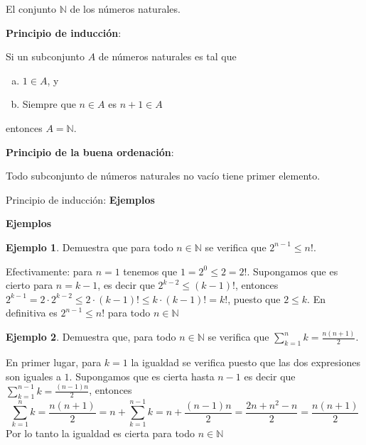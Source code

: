 \documentclass[
  ignorenonframetext,
]{beamer}
\begin{document}
\begin{frame}{El conjunto \(\mathbb{N}\) de los números naturales.}
\protect\hypertarget{el-conjunto-mathbbn-de-los-nuxfameros-naturales.}{}

\textbf{Principio de inducción}:

Si un subconjunto \(A\) de números naturales es tal que

\begin{enumerate}
[a)]
\item
  \(1 \in A\), y
\item
  Siempre que \(n \in A\) es \(n+1 \in A\)
\end{enumerate}

entonces \(A = \mathbb{N}\).

\textbf{Principio de la buena ordenación}:

Todo subconjunto de números naturales no vacío tiene primer elemento.

\end{frame}

\begin{frame}{Principio de inducción: \textbf{Ejemplos}}
\protect\hypertarget{principio-de-inducciuxf3n-ejemplos}{}

\textbf{Ejemplos}

\textbf{Ejemplo 1}. Demuestra que para todo \(n\in \mathbb{N}\) se
verifica que \(2^{n-1}\leq n!\).

Efectivamente: para \(n=1\) tenemos que \(1=2^0 \leq 2 =2!\). Supongamos
que es cierto para \(n=k-1\), es decir que \(2^{k-2} \leq (k-1)!\),
entonces
\(2^{k-1} = 2\cdot 2^{k-2} \leq 2 \cdot (k-1)! \leq k\cdot(k-1)! =k!\),
puesto que \(2\leq k\). En definitiva es \(2^{n-1}\leq n!\) para todo
\(n \in \mathbb{N}\)

\textbf{Ejemplo 2}. Demuestra que, para todo \(n \in \mathbb{N}\) se
verifica que \(\displaystyle{\sum_{k=1}^n k = \frac{n(n+1)}{2}}\).

En primer lugar, para \(k=1\) la igualdad se verifica puesto que las dos
expresiones son iguales a \(1\). Supongamos que es cierta hasta \(n-1\)
es decir que \(\displaystyle{\sum_{k=1}^{n-1} k = \frac{(n-1)n}{2}}\),
entonces \[
\sum_{k=1}^n k = \frac{n(n+1)}{2} = n+\sum_{k=1}^{n-1} k = n+  \frac{(n-1)n}{2}= \frac{2n+n^2-n}{2} = \frac{n(n+1)}{2}
\] Por lo tanto la igualdad es cierta para todo \(n \in \mathbb{N}\)

\end{frame}
\end{document}
